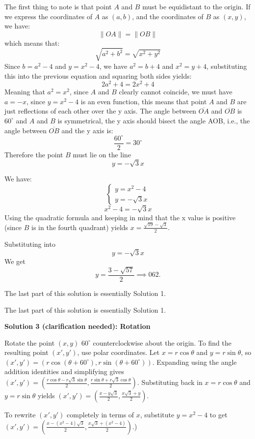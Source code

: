 \begin{enumerate}
 The first thing to note is that point $A$ and $B$ must be equidistant to the origin. If we express the coordinates of $A$ as $(a, b)$, and the coordinates of $B$ as $(x, y)$, we have:
 \[\|OA\| = \|OB\|\]which means that:
 \[\sqrt{a^2 + b^2} = \sqrt{x^2 + y^2}\]Since $b = a^2 - 4$ and $y = x^2 - 4$, we have $a^2 = b + 4$ and $x^2 = y + 4$, substituting this into the previous equation and squaring both sides yields:
 \[2a^2 + 4 = 2x^2 + 4\]Meaning that $a^2 = x^2$, since $A$ and $B$ clearly cannot coincide, we must have $a = -x$, since $y = x^2 - 4$ is an even function, this means that point $A$ and $B$ are just reflections of each other over the y axis. The angle between $\overline{OA}$ and $\overline{OB}$ is $60^\circ$ and $A$ and $B$ is symmetrical, the y axis should bisect the angle \angle AOB, i.e., the angle between $\overline{OB}$ and the y axis is:
 \[\frac{60^\circ}{2} = 30^\circ\]  Therefore the point $B$ must lie on the line 
 \[y = -\sqrt{3}x\]

 We have:
 \[\begin{cases}y = x^2 - 4 \\ y = -\sqrt{3}x \end{cases}\]
 \[x^2 - 4 = -\sqrt{3}x\]Using the quadratic formula and keeping in mind that the x value is positive (since $B$ is in the fourth quadrant) yields $x = \frac{\sqrt{19} - \sqrt{3}}{2}$.

 Substituting into 
 \[y = -\sqrt{3}x\] We get 
 \[y=\frac{3-\sqrt{57}}{2}\implies \boxed{062}.\]

 The last part of this solution is essentially Solution 1.

 The last part of this solution is essentially Solution 1.

 



\textbf{Solution 3 (clarification needed): Rotation}

Rotate the point $(x,y)$ $60^\circ$ counterclockwise about the origin. To find the resulting point $(x',y')$, use polar coordinates. Let $x=r \cos\theta$ and $y=r \sin\theta$, so $(x',y')=(r \cos({\theta+60^\circ}), r \sin({\theta+60^\circ}))$. Expanding using the angle addition identities and simplifying gives $(x',y')=\left(\frac{r\cos\theta-r\sqrt{3}\sin\theta}{2}, \frac{r\sin\theta+r\sqrt{3}\cos\theta}{2}\right)$. Substituting back in $x=r \cos\theta$ and $y=r \sin\theta$ yields $(x',y')=\left(\frac{x-y\sqrt{3}}{2}, \frac{x\sqrt{3}+y}{2}\right)$.

 
To rewrite $(x',y')$ completely in terms of $x$, substitute $y=x^2-4$ to get $(x',y')=\left(\frac{x-(x^2-4)\sqrt{3}}{2}, \frac{x\sqrt{3}+(x^2-4)}{2}\right)$.) 


\end{enumerate}
